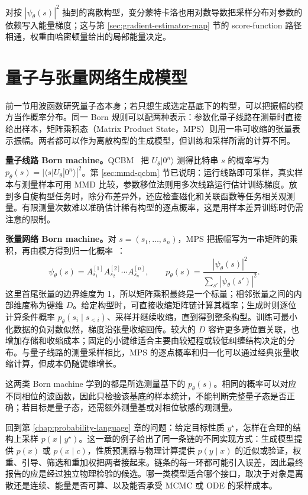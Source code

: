 对按 \(|\psi_\theta(s)|^2\) 抽到的离散构型，变分蒙特卡洛也用对数导数把采样分布对参数的依赖写入能量梯度；这与第 \ref{sec:gradient-estimator-map} 节的 score-function 路径相通，权重由哈密顿量给出的局部能量决定。

\section{量子与张量网络生成模型}

前一节用波函数研究量子态本身；若只想生成选定基底下的构型，可以把振幅的模方当作概率分布。同一 Born 规则可以配两种表示：参数化量子线路在测量时直接给出样本，矩阵乘积态（Matrix Product State，MPS）则用一串可收缩的张量表示振幅。两者都可以作为离散构型的生成模型，但训练和采样所需的计算不同。

\textbf{量子线路 Born machine。}QCBM~\cite{liu2018qcbm} 把 \(U_\theta|0^n\rangle\) 测得比特串 \(s\) 的概率写为 \(p_\theta(s)=|\langle s|U_\theta|0^n\rangle|^2\)。第 \ref{sec:mmd-qcbm} 节已说明：运行线路即可采样，真实样本与测量样本可用 MMD 比较，参数移位法则用多次线路运行估计训练梯度。放到多自旋构型任务时，除分布差异外，还应检查磁化和关联函数等任务相关观测量。有限测量次数难以准确估计稀有构型的逐点概率，这是用样本差异训练时仍需注意的限制。

\textbf{张量网络 Born machine。}对 \(s=(s_1,\ldots,s_n)\)，MPS 把振幅写为一串矩阵的乘积，再由模方得到归一化概率~\cite{han2018mps}：
\begin{equation}
 \psi_\theta(s)=A^{[1]}_{s_1}A^{[2]}_{s_2}\cdots A^{[n]}_{s_n},\qquad
 p_\theta(s)=\frac{|\psi_\theta(s)|^2}{\sum_{s'}|\psi_\theta(s')|^2}.
\end{equation}
这里首尾张量的边界维度为 1，所以矩阵乘积最终是一个标量；相邻张量之间的内部维度称为键维 \(D\)。给定构型时，可直接收缩矩阵链计算其概率；生成时则逐位计算条件概率 \(p_\theta(s_i\mid s_{<i})\)、采样并继续收缩，直到得到整条构型。训练可最小化数据的负对数似然，梯度沿张量收缩回传。较大的 \(D\) 容许更多跨位置关联，也增加存储和收缩成本；固定的小键维适合主要由较短程或较低纠缠结构决定的分布。与量子线路的测量采样相比，MPS 的逐点概率和归一化可以通过经典张量收缩计算，但成本仍随键维增长。

这两类 Born machine 学到的都是所选测量基下的 \(p_\theta(s)\)。相同的概率可以对应不同相位的波函数，因此只检验该基底的样本统计，不能判断完整量子态是否正确；若目标是量子态，还需额外测量基或对相位敏感的观测量。

回到第 \ref{chap:probability-language} 章的问题：给定目标性质 \(y^\star\)，怎样在合理的结构上采样 \(p(x\mid y^\star)\)。这一章的例子给出了同一条链的不同实现方式：生成模型提供 \(p(x)\) 或 \(p(x\mid c)\)，性质预测器与物理计算提供 \(p(y\mid x)\) 的近似或验证，权重、引导、筛选和重加权把两者接起来。链条的每一环都可能引入误差，因此最终报告的应是经过独立物理检验的候选。哪一类模型适合哪个接口，取决于对象是离散还是连续、能量是否可算、以及能否承受 MCMC 或 ODE 的采样成本。
